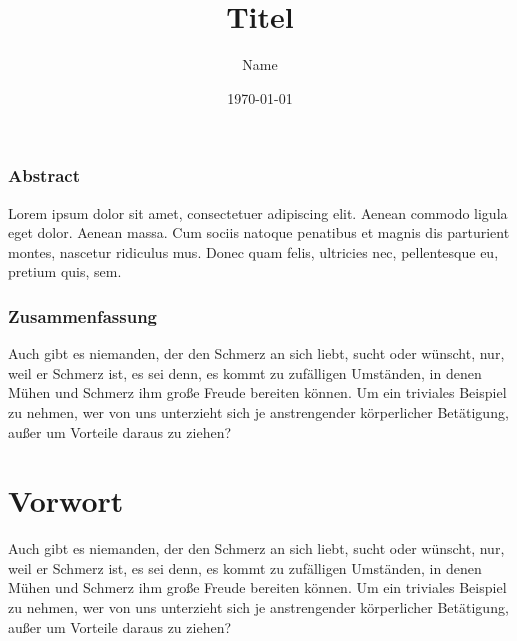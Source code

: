\documentclass[12pt,a4paper]{scrbook} %
\author{Name}
\title{Titel}
\date{\today}
\newenvironment{abstract}{%
  \let\raggedsection\centering
  \subsection*{Abstract}%
}{\par}
\newenvironment{zusammenfassung}{%
  \let\raggedsection\centering
  \subsection*{Zusammenfassung}%
}{\par}
\begin{document}
\begin{onehalfspacing}

	
	\maketitle	
	\newpage
	
	\begin{abstract}
		Lorem ipsum dolor sit amet, consectetuer adipiscing elit. Aenean commodo ligula eget dolor. Aenean massa. Cum sociis natoque penatibus et magnis dis parturient montes, nascetur ridiculus mus. Donec quam felis, ultricies nec, pellentesque eu, pretium quis, sem.
	\end{abstract}	
	\begin{zusammenfassung}
		Auch gibt es niemanden, der den Schmerz an sich liebt, sucht oder wünscht, nur, weil er Schmerz ist, es sei denn, es kommt zu zufälligen Umständen, in denen Mühen und Schmerz ihm große Freude bereiten können. Um ein triviales Beispiel zu nehmen, wer von uns unterzieht sich je anstrengender körperlicher Betätigung, außer um Vorteile daraus zu ziehen?
	\end{zusammenfassung}
	
	\tableofcontents
	\newpage
	
	\listoffigures
	\newpage
	
	\listoftables
	\newpage
		
	\chapter*{Vorwort}
		Auch gibt es niemanden, der den Schmerz an sich liebt, sucht oder wünscht, nur, weil er Schmerz ist, es sei denn, es kommt zu zufälligen Umständen, in denen Mühen und Schmerz ihm große Freude bereiten können. Um ein triviales Beispiel zu nehmen, wer von uns unterzieht sich je anstrengender körperlicher Betätigung, außer um Vorteile daraus zu ziehen?
		\newpage

	\pagestyle{fancy}
	
	

\end{onehalfspacing}
\end{document}
